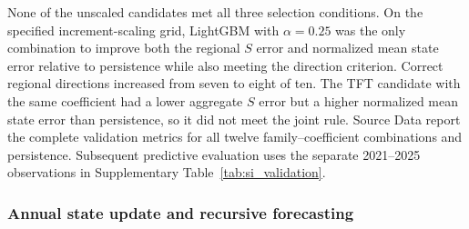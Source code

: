 None of the unscaled candidates met all three selection conditions. On the specified increment-scaling grid, LightGBM with $\alpha=0.25$ was the only combination to improve both the regional $S$ error and normalized mean state error relative to persistence while also meeting the direction criterion. Correct regional directions increased from seven to eight of ten. The TFT candidate with the same coefficient had a lower aggregate $S$ error but a higher normalized mean state error than persistence, so it did not meet the joint rule. Source Data report the complete validation metrics for all twelve family--coefficient combinations and persistence. Subsequent predictive evaluation uses the separate 2021--2025 observations in Supplementary Table~\ref{tab:si_validation}.

\subsubsection{Annual state update and recursive forecasting}

